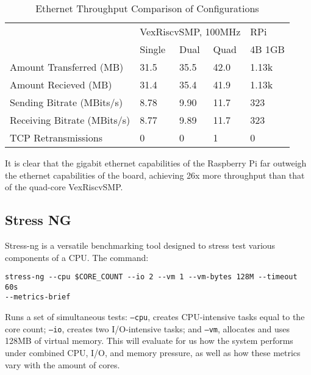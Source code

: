 \begin{table*}[ht]
    \centering
    \caption{Ethernet Throughput Comparison of Configurations}
    \begin{tabular}{lllll}
                                & \multicolumn{3}{l}{VexRiscvSMP, 100MHz} & RPi    \\ \cline{2-5} 
                                & Single        & Dual       & Quad       & 4B 1GB \\ \hline
    Amount Transferred (MB)     & 31.5          & 35.5       & 42.0       & 1.13k  \\
    Amount Recieved (MB)        & 31.4          & 35.4       & 41.9       & 1.13k  \\
    Sending Bitrate (MBits/s)   & 8.78          & 9.90       & 11.7       & 323    \\
    Receiving Bitrate (MBits/s) & 8.77          & 9.89       & 11.7       & 323    \\
    TCP Retransmissions         & 0             & 0          & 1          & 0      \\ \hline
    \end{tabular}
    \label{ethernet1}
\end{table*}

It is clear that the gigabit ethernet capabilities of the Raspberry Pi far outweigh the ethernet capabilities of the board, achieving 26x more throughput than that of the quad-core VexRiscvSMP.


\subsection{Stress NG}
Stress-ng is a versatile benchmarking tool designed to stress test various components of a CPU. The command:
\begin{verbatim}
stress-ng --cpu $CORE_COUNT --io 2 --vm 1 --vm-bytes 128M --timeout 60s 
--metrics-brief
\end{verbatim}
Runs a set of simultaneous tests: \texttt{--cpu}, creates CPU-intensive tasks equal to the core count; \texttt{--io}, creates two I/O-intensive tasks; and \texttt{--vm}, allocates and uses 128MB of virtual memory. This will evaluate for us how the system performs under combined CPU, I/O, and memory pressure, as well as how these metrics vary with the amount of cores.

